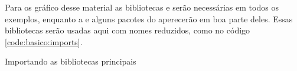 Para os gráfico desse material as bibliotecas \pandas e \matplotlib serão necessárias em todos os exemplos, enquanto a \numpy e alguns pacotes do \scipy aperecerão em boa parte deles. Essas bibliotecas serão usadas aqui com nomes reduzidos, como no código \ref{code:basico:imports}.

\begin{listing}[H]
    \caption{Importando as bibliotecas principais}
    \label{code:basico:imports}

\end{listing}

